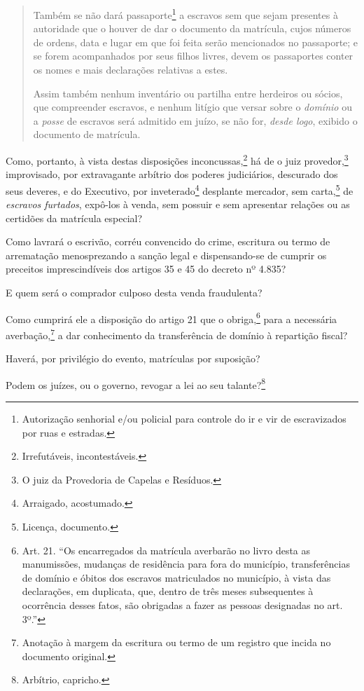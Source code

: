 {\begin{quote}
Também se não dará passaporte\footnote{Autorização senhorial e/ou
  policial para controle do ir e vir de escravizados por ruas e
  estradas.} a escravos sem que sejam presentes à autoridade que o
houver de dar o documento da matrícula, cujos números de ordens, data e
lugar em que foi feita serão mencionados no passaporte; e se forem
acompanhados por seus filhos livres, devem os passaportes conter os
nomes e mais declarações relativas a estes.

Assim também nenhum inventário ou partilha entre herdeiros ou sócios,
que compreender escravos, e nenhum litígio que versar sobre o
\emph{domínio} ou a \emph{posse} de escravos será admitido em juízo, se
não for, \emph{desde logo}, exibido o documento de matrícula.
\end{quote}

Como, portanto, à vista destas disposições inconcussas,\footnote{
  Irrefutáveis, incontestáveis.} há de o juiz provedor,\footnote{O
  juiz da Provedoria de Capelas e Resíduos.} improvisado, por
extravagante arbítrio dos poderes judiciários, descurado dos seus
deveres, e do Executivo, por inveterado\footnote{Arraigado,
  acostumado.} desplante mercador, sem carta,\footnote{Licença,
  documento.} de \emph{escravos furtados}, expô-los à venda, sem
possuir e sem apresentar relações ou as certidões da matrícula especial?

Como lavrará o escrivão, corréu convencido do crime, escritura ou termo
de arrematação menosprezando a sanção legal e dispensando-se de cumprir
os preceitos imprescindíveis dos artigos 35 e 45 do decreto nº 4.835?

E quem será o comprador culposo desta venda fraudulenta?

Como cumprirá ele a disposição do artigo 21 que o obriga,\footnote{
  Art. 21. ``Os encarregados da matrícula averbarão no livro desta as
  manumissões, mudanças de residência para fora do município,
  transferências de domínio e óbitos dos escravos matriculados no
  município, à vista das declarações, em duplicata, que, dentro de três
  meses subsequentes à ocorrência desses fatos, são obrigadas a fazer as
  pessoas designadas no art. 3º.''} para a necessária averbação,\footnote{
  Anotação à margem da escritura ou termo de um registro que incida no
  documento original.} a dar conhecimento da transferência de domínio à
repartição fiscal?

Haverá, por privilégio do evento, matrículas por suposição?

Podem os juízes, ou o governo, revogar a lei ao seu talante?\footnote{
  Arbítrio, capricho.}

}
